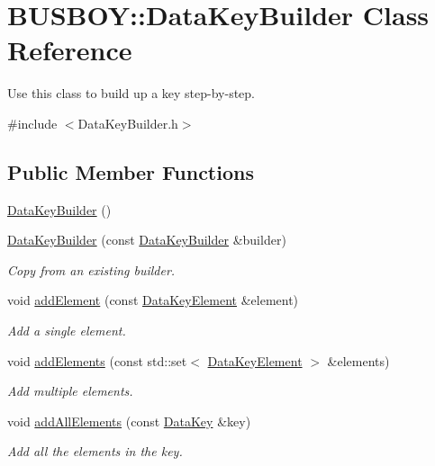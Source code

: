 \hypertarget{classBUSBOY_1_1DataKeyBuilder}{
\section{BUSBOY::DataKeyBuilder Class Reference}
\label{classBUSBOY_1_1DataKeyBuilder}
}


Use this class to build up a key step-\/by-\/step.  


{\ttfamily \#include $<$DataKeyBuilder.h$>$}\subsection*{Public Member Functions}
\begin{DoxyCompactItemize}
\item 
\hyperlink{classBUSBOY_1_1DataKeyBuilder_a9a682e24401e974b9685b24bec544743}{DataKeyBuilder} ()
\item 
\hyperlink{classBUSBOY_1_1DataKeyBuilder_a130457a8984380314e2866d6c65f2e33}{DataKeyBuilder} (const \hyperlink{classBUSBOY_1_1DataKeyBuilder}{DataKeyBuilder} \&builder)
\begin{DoxyCompactList}\small\item\em Copy from an existing builder. \item\end{DoxyCompactList}\item 
void \hyperlink{classBUSBOY_1_1DataKeyBuilder_a7f3b8d21410ed748f817972282905c68}{addElement} (const \hyperlink{classBUSBOY_1_1DataKeyElement}{DataKeyElement} \&element)
\begin{DoxyCompactList}\small\item\em Add a single element. \item\end{DoxyCompactList}\item 
void \hyperlink{classBUSBOY_1_1DataKeyBuilder_aaaa7e47e047fd2620e76879aa594c639}{addElements} (const std::set$<$ \hyperlink{classBUSBOY_1_1DataKeyElement}{DataKeyElement} $>$ \&elements)
\begin{DoxyCompactList}\small\item\em Add multiple elements. \item\end{DoxyCompactList}\item 
void \hyperlink{classBUSBOY_1_1DataKeyBuilder_a853b4ba99c8f62865601e7bd25f94597}{addAllElements} (const \hyperlink{classBUSBOY_1_1DataKey}{DataKey} \&key)
\begin{DoxyCompactList}\small\item\em Add all the elements in the key. \item\end{DoxyCompactList}\item 

\end{DoxyCompactItemize}
